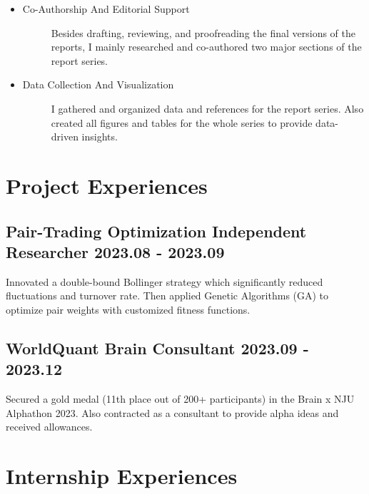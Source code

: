 \documentclass[a4paper]{article}
\begin{document}
\begin{itemize}
    \item \begin{description}
        \item[Co-Authorship And Editorial Support] Besides drafting, reviewing, and proofreading the final versions of the reports, I mainly researched and co-authored two major sections of the report series.
    \end{description}
    \item \begin{description}
        \item[Data Collection And Visualization] I gathered and organized data and references for the report series. Also created all figures and tables for the whole series to provide data-driven insights. 
    \end{description} 
\end{itemize}

\newpage
\hspace{2cm}

\section{Project Experiences} %
\subsection{Pair-Trading Optimization \normalfont \hfill Independent Researcher \hspace{70pt} 2023.08 - 2023.09}
Innovated a double-bound Bollinger strategy which significantly reduced fluctuations and turnover rate. Then applied Genetic Algorithms (GA) to optimize pair weights with customized fitness functions.

\subsection{WorldQuant Brain \normalfont \hfill Consultant\hspace{70pt} 2023.09 - 2023.12}
Secured a gold medal (11th place out of 200+ participants) in the Brain x NJU Alphathon 2023. Also contracted as a consultant to provide alpha ideas and received allowances.

\section{Internship Experiences} %
\end{document}
